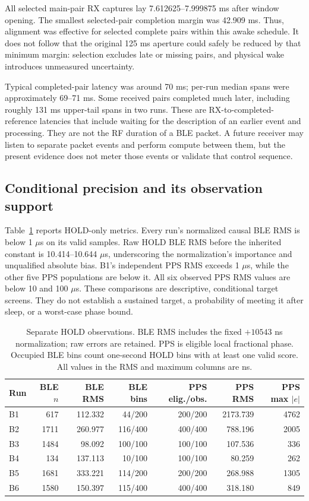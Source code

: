 \documentclass[11pt,letterpaper]{article}
\begin{document}
All selected main-pair RX captures lay 7.612625--7.999875 ms after window opening. The smallest selected-pair completion margin was 42.909 ms. Thus, alignment was effective for selected complete pairs within this awake schedule. It does not follow that the original 125 ms aperture could safely be reduced by that minimum margin: selection excludes late or missing pairs, and physical wake introduces unmeasured uncertainty.

Typical completed-pair latency was around 70 ms; per-run median spans were approximately 69--71 ms. Some received pairs completed much later, including roughly 131 ms upper-tail spans in two runs. These are RX-to-completed-reference latencies that include waiting for the description of an earlier event and processing. They are not the RF duration of a BLE packet. A future receiver may listen to separate packet events and perform compute between them, but the present evidence does not meter those events or validate that control sequence.

\subsection{Conditional precision and its observation support}
Table~\ref{tab:precision} reports HOLD-only metrics. Every run's normalized causal BLE RMS is below 1 $\mu$s on its valid samples. Raw HOLD BLE RMS before the inherited constant is 10.414--10.644 $\mu$s, underscoring the normalization's importance and unqualified absolute bias. B1's independent PPS RMS exceeds 1 $\mu$s, while the other five PPS populations are below it. All six observed PPS RMS values are below 10 and 100 $\mu$s. These comparisons are descriptive, conditional target screens. They do not establish a sustained target, a probability of meeting it after sleep, or a worst-case phase bound.

\begin{table}[t]
\centering\small
\caption{Separate HOLD observations. BLE RMS includes the fixed $+10543$ ns normalization; raw errors are retained. PPS is eligible local fractional phase. Occupied BLE bins count one-second HOLD bins with at least one valid score. All values in the RMS and maximum columns are ns.}\label{tab:precision}
\begin{tabular}{lrrrrrr}\toprule
Run & BLE $n$ & BLE RMS & BLE bins & PPS elig./obs. & PPS RMS & PPS max $|e|$\\\midrule
B1 & 617 & 112.332 & 44/200 & 200/200 & 2173.739 & 4762\\
B2 & 1711 & 260.977 & 116/400 & 400/400 & 788.196 & 2005\\
B3 & 1484 & 98.092 & 100/100 & 100/100 & 107.536 & 336\\
B4 & 134 & 137.113 & 10/100 & 100/100 & 80.259 & 262\\
B5 & 1681 & 333.221 & 114/200 & 200/200 & 268.988 & 1305\\
B6 & 1580 & 150.397 & 115/400 & 400/400 & 318.180 & 849\\\bottomrule
\end{tabular}
\end{table}
\end{document}
